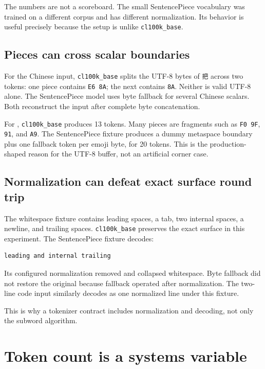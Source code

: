 The numbers are not a scoreboard. The small SentencePiece vocabulary was
trained on a different corpus and has different normalization. Its
behavior is useful precisely because the setup is unlike
\texttt{cl100k\_base}.

\subsection{Pieces can cross scalar
boundaries}\label{pieces-can-cross-scalar-boundaries}

For the Chinese input, \texttt{cl100k\_base} splits the UTF-8 bytes of
\texttt{把} across two tokens: one piece contains \texttt{E6\ 8A}; the
next contains \texttt{8A}. Neither is valid UTF-8 alone. The
SentencePiece model uses byte fallback for several Chinese scalars. Both
reconstruct the input after complete byte concatenation.

For ,
\texttt{cl100k\_base} produces 13 tokens. Many pieces are fragments such
as \texttt{F0\ 9F}, \texttt{91}, and \texttt{A9}. The SentencePiece
fixture produces a dummy metaspace boundary plus one fallback token per
emoji byte, for 20 tokens. This is the production-shaped reason for the
UTF-8 buffer, not an artificial corner case.

\subsection{Normalization can defeat exact surface round
trip}\label{normalization-can-defeat-exact-surface-round-trip}

The whitespace fixture contains leading spaces, a tab, two internal
spaces, a newline, and trailing spaces. \texttt{cl100k\_base} preserves
the exact surface in this experiment. The SentencePiece fixture decodes:

\begin{verbatim}
leading and internal trailing
\end{verbatim}

Its configured normalization removed and collapsed whitespace. Byte
fallback did not restore the original because fallback operated after
normalization. The two-line code input similarly decodes as one
normalized line under this fixture.

This is why a tokenizer contract includes normalization and decoding,
not only the subword algorithm.

\section{Token count is a systems
variable}\label{token-count-is-a-systems-variable}

